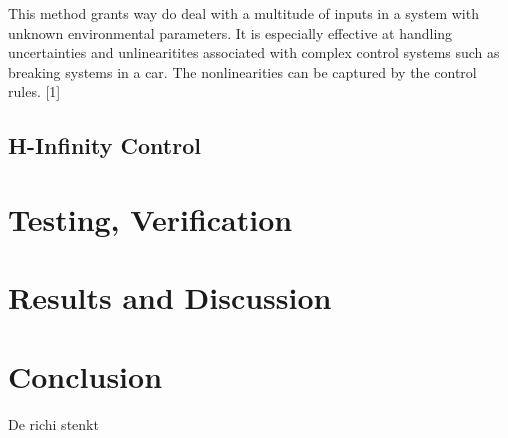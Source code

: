 \documentclass[conference]{IEEEtran}
\begin{document}
This method grants way do deal with a multitude of inputs in a system with unknown environmental
parameters. It is especially effective at handling uncertainties and unlinearitites associated
with complex control systems such as breaking systems in a car. The nonlinearities can be 
captured by the control rules.
[1]
\subsection{H-Infinity Control}

\section{Testing, Verification}


\section{Results and Discussion}




\section{Conclusion}

De richi stenkt 
\end{document}

